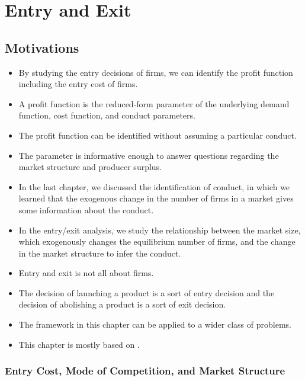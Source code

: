 \documentclass[
]{book}
\providecommand{\tightlist}{%
  \setlength{\itemsep}{0pt}\setlength{\parskip}{0pt}}
\begin{document}
\hypertarget{entryexit}{%
\chapter{Entry and Exit}\label{entryexit}}

\hypertarget{motivations-3}{%
\section{Motivations}\label{motivations-3}}

\begin{itemize}
\tightlist
\item
  By studying the entry decisions of firms, we can identify the profit function including the entry cost of firms.
\item
  A profit function is the reduced-form parameter of the underlying demand function, cost function, and conduct parameters.
\item
  The profit function can be identified without assuming a particular conduct.
\item
  The parameter is informative enough to answer questions regarding the market structure and producer surplus.
\item
  In the last chapter, we discussed the identification of conduct, in which we learned that the exogenous change in the number of firms in a market gives some information about the conduct.
\item
  In the entry/exit analysis, we study the relationship between the market size, which exogenously changes the equilibrium number of firms, and the change in the market structure to infer the conduct.
\item
  Entry and exit is not all about firms.
\item
  The decision of launching a product is a sort of entry decision and the decision of abolishing a product is a sort of exit decision.
\item
  The framework in this chapter can be applied to a wider class of problems.
\item
  This chapter is mostly based on \citet{berryIdentificationModelsOligopoly2006}.
\end{itemize}

\hypertarget{entry-cost-mode-of-competition-and-market-structure}{%
\subsection{Entry Cost, Mode of Competition, and Market Structure}\label{entry-cost-mode-of-competition-and-market-structure}}
\end{document}
